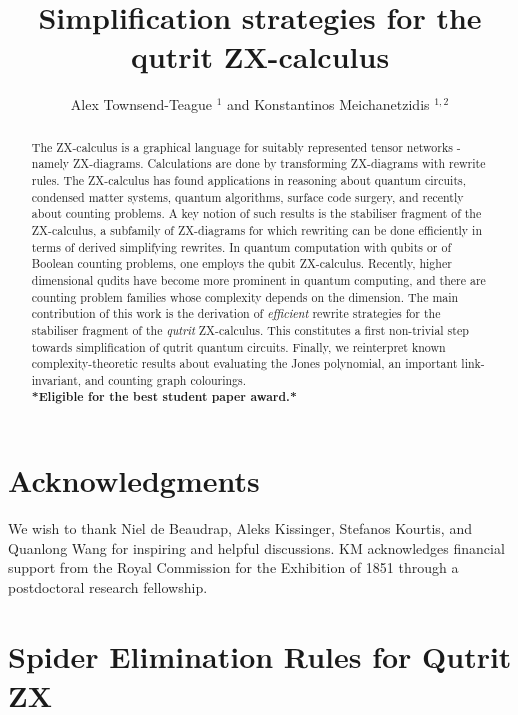 \documentclass[runningheads]{llncs}
\title{Simplification strategies for the\\
qutrit ZX-calculus}
\author{Alex Townsend-Teague $^{1}$ and Konstantinos Meichanetzidis $^{1,2}$
	\institute{$^1$ University of Oxford \\ $^2$ Cambridge Quantum Computing Ltd.}
}
\begin{document}
\maketitle
\begin{abstract}
	The ZX-calculus is a graphical language for suitably represented tensor networks - namely ZX-diagrams.
	Calculations are done by transforming ZX-diagrams with rewrite rules.
	The ZX-calculus has found applications in reasoning about quantum circuits, condensed matter systems, quantum algorithms, surface code surgery, and recently about counting problems.
	A key notion of such results is the stabiliser fragment of the ZX-calculus, a subfamily of ZX-diagrams for which rewriting can be done efficiently in terms of derived simplifying rewrites.
	In quantum computation with qubits or of Boolean counting problems, one employs the qubit ZX-calculus.
	Recently, higher dimensional qudits have become more prominent in quantum computing, and there are counting problem families whose complexity depends on the dimension.
	The main contribution of this work is the derivation of
	\emph{efficient} rewrite strategies for the stabiliser fragment of the \emph{qutrit} ZX-calculus.
	This constitutes a first non-trivial step towards simplification of qutrit quantum circuits. Finally, we reinterpret known complexity-theoretic results about evaluating the Jones polynomial, an important link-invariant, and counting graph colourings.\\
	\textbf{*Eligible for the best student paper award.*}
\end{abstract}







\section{Acknowledgments}
We wish to thank Niel de Beaudrap, Aleks Kissinger, Stefanos 
Kourtis, and Quanlong Wang for inspiring and helpful discussions.
KM acknowledges financial support from the Royal Commission for the Exhibition of 1851 through a postdoctoral research fellowship.

% 



\appendix



\section{Spider Elimination Rules for Qutrit ZX}




\end{document}
